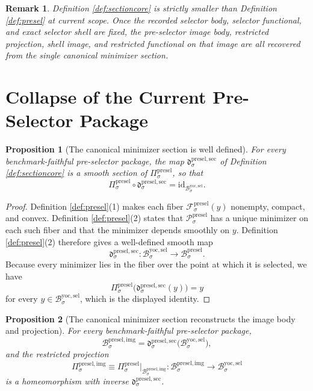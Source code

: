 \documentclass[11pt]{article}
\newcommand{\YoctoSelectorBody}[1]{\mathcal B_{#1}^{\mathrm{yoc,sel}}}
\newcommand{\PreSelectorBody}[1]{\mathcal B_{#1}^{\mathrm{presel}}}
\newcommand{\PreSelectorProj}[1]{\Pi_{#1}^{\mathrm{presel}}}
\newcommand{\PreSelectorFiber}[2]{\mathcal F_{#1}^{\mathrm{presel}}(#2)}
\newcommand{\PreSelectorFunctional}[1]{\mathscr P_{#1}^{\mathrm{presel}}}
\newcommand{\PreSelectorMinSection}[1]{\mathfrak d_{#1}^{\mathrm{presel,sec}}}
\newcommand{\PreSelectorImgBody}[1]{\mathcal B_{#1}^{\mathrm{presel,img}}}
\newcommand{\PreSelectorImgProj}[1]{\Pi_{#1}^{\mathrm{presel,img}}}
\newtheorem{proposition}{Proposition}
\newtheorem{remark}{Remark}
\begin{document}
\begin{remark}
Definition \ref{def:sectioncore} is strictly smaller than Definition \ref{def:presel} at current scope. Once the recorded selector body, selector functional, and exact selector shell are fixed, the pre-selector image body, restricted projection, shell image, and restricted functional on that image are all recovered from the single canonical minimizer section.
\end{remark}

\section{Collapse of the Current Pre-Selector Package}

\begin{proposition}[The canonical minimizer section is well defined]
\label{prop:section}
For every benchmark-faithful pre-selector package, the map \(\PreSelectorMinSection{\sigma}\) of Definition \ref{def:sectioncore} is a smooth section of \(\PreSelectorProj{\sigma}\), so that
\[
\PreSelectorProj{\sigma}\circ\PreSelectorMinSection{\sigma}
=
\mathrm{id}_{\YoctoSelectorBody{\sigma}}.
\]
\end{proposition}

\begin{proof}
Definition \ref{def:presel}(1) makes each fiber \(\PreSelectorFiber{\sigma}{y}\) nonempty, compact, and convex. Definition \ref{def:presel}(2) states that \(\PreSelectorFunctional{\sigma}\) has a unique minimizer on each such fiber and that the minimizer depends smoothly on \(y\). Definition \ref{def:presel}(2) therefore gives a well-defined smooth map
\[
\PreSelectorMinSection{\sigma}:\YoctoSelectorBody{\sigma}\to\PreSelectorBody{\sigma}.
\]
Because every minimizer lies in the fiber over the point at which it is selected, we have
\[
\PreSelectorProj{\sigma}\bigl(\PreSelectorMinSection{\sigma}(y)\bigr)=y
\]
for every \(y\in\YoctoSelectorBody{\sigma}\), which is the displayed identity.
\end{proof}

\begin{proposition}[The canonical minimizer section reconstructs the image body and projection]
\label{prop:reconstructbody}
For every benchmark-faithful pre-selector package,
\[
\PreSelectorImgBody{\sigma}
=
\PreSelectorMinSection{\sigma}\bigl(\YoctoSelectorBody{\sigma}\bigr),
\]
and the restricted projection
\[
\PreSelectorImgProj{\sigma}
\equiv
\PreSelectorProj{\sigma}\big|_{\PreSelectorImgBody{\sigma}}
:
\PreSelectorImgBody{\sigma}\to\YoctoSelectorBody{\sigma}
\]
is a homeomorphism with inverse \(\PreSelectorMinSection{\sigma}\).
\end{proposition}
\end{document}
